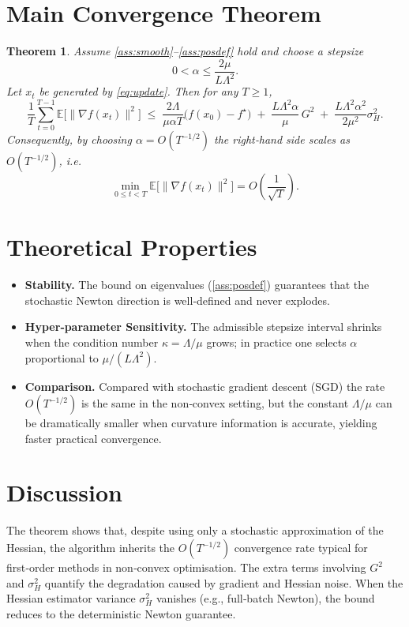 \documentclass{article}
\newtheorem{theorem}{Theorem}[section]
\begin{document}
\section*{Main Convergence Theorem}
\begin{theorem}\label{thm:main}
Assume \ref{ass:smooth}–\ref{ass:posdef} hold and choose a stepsize
\[
0<\alpha\le\frac{2\mu}{L\Lambda^{2}}.
\]
Let $x_{t}$ be generated by \eqref{eq:update}. Then for any $T\ge1$,
\[
\frac{1}{T}\sum_{t=0}^{T-1}\mathbb{E}\!\big[\|\nabla f(x_{t})\|^{2}\big]
\;\le\;
\frac{2\Lambda}{\mu\alpha T}\big(f(x_{0})-f^{\star}\big)
\;+\;
\frac{L\Lambda^{2}\alpha}{\mu}\,G^{2}
\;+\;
\frac{L\Lambda^{2}\alpha^{2}}{2\mu^{2}}\sigma_{H}^{2}.
\]
Consequently, by choosing $\alpha=O(T^{-1/2})$ the right‑hand side scales as $O(T^{-1/2})$,
i.e.
\[
\min_{0\le t<T}\mathbb{E}\!\big[\|\nabla f(x_{t})\|^{2}\big]=O\!\left(\frac{1}{\sqrt{T}}\right).
\]
\end{theorem}

\section*{Theoretical Properties}
\begin{itemize}
\item \textbf{Stability.} The bound on eigenvalues (\ref{ass:posdef}) guarantees that the stochastic Newton direction is well‑defined and never explodes.
\item \textbf{Hyper‑parameter Sensitivity.} The admissible stepsize interval shrinks when the condition number $\kappa=\Lambda/\mu$ grows; in practice one selects $\alpha$ proportional to $\mu/(L\Lambda^{2})$.
\item \textbf{Comparison.} Compared with stochastic gradient descent (SGD) the rate $O(T^{-1/2})$ is the same in the non‑convex setting, but the constant $\Lambda/\mu$ can be dramatically smaller when curvature information is accurate, yielding faster practical convergence.
\end{itemize}

\section*{Discussion}
The theorem shows that, despite using only a stochastic approximation of the Hessian, the algorithm inherits the $O(T^{-1/2})$ convergence rate typical for first‑order methods in non‑convex optimisation. The extra terms involving $G^{2}$ and $\sigma_{H}^{2}$ quantify the degradation caused by gradient and Hessian noise. When the Hessian estimator variance $\sigma_{H}^{2}$ vanishes (e.g., full‑batch Newton), the bound reduces to the deterministic Newton guarantee.
\end{document}
